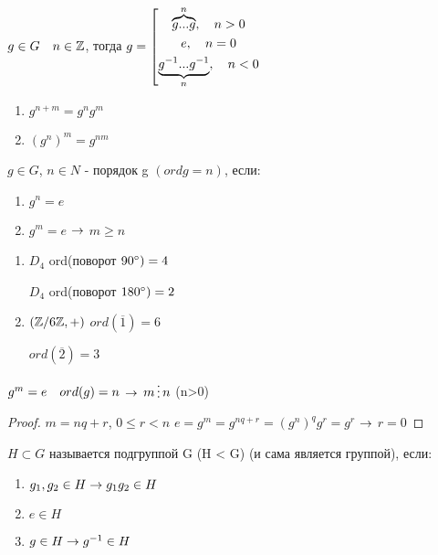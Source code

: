 \documentclass[main2]{subfiles}
\begin{document}
\begin{definition}
    $g \in G \quad n \in \mathbb{Z}$, тогда $g=
\left[
  \begin{gathered}
    \overbrace{g...g}^n, \quad n>0\\
    e, \quad n=0\\
    \underbrace{g^{-1}...g^{-1}}_n, \quad n<0
  \end{gathered}
\right.$
\end{definition}

\begin{theorem}[св-ва]
    \begin{enumerate}
    	\item $g^{n+m}=g^n g^m$
    	\item $(g^n)^m=g^{n m}$
	\end{enumerate}
\end{theorem}

\begin{definition}
    $g \in G$, $n \in N$ - порядок g $(ord g = n)$, если:
    \begin{enumerate}
    	\item $g^n=e$
    	\item $g^m=e$ $\rightarrow$ $m \geqslant n$
	\end{enumerate}
\end{definition}

\begin{examples}
    \begin{enumerate}
    	\item $D_4$ ord(поворот $90\degree) =4$

    	$D_4$ ord(поворот $180\degree) =2$
    	\item $(\mathbb{Z} /6 \mathbb{Z}, +)$ $ord(\overline{1})=6$

    	$ord(\overline{2})=3$
	\end{enumerate}
\end{examples}

\begin{utv}
    $g^m=e \quad ord(g)=n$ $\rightarrow$ $m \devides n$ (n>0)
\end{utv}

\begin{proof}
    $m=n q+r$, $0 \leqslant r < n$
    $e=g^m=g^{n q + r}=(g^n)^q g^r=g^r$ $\rightarrow$ $r=0$
\end{proof}

\begin{definition}
    $H \subset G$ называется подгруппой G (H < G) (и сама является группой), если:
    \begin{enumerate}
    	\item $g_1,g_2 \in H \rightarrow g_1 g_2 \in H$
    	\item $e \in H$
    	\item $g \in H \rightarrow g^{-1} \in H$
	\end{enumerate}
\end{definition}
\end{document}
